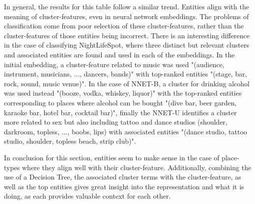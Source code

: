 In general, the results for this table follow a similar trend. Entities align with the meaning of cluster-features, even in neural network embeddings. The problems of classification come from poor selection of these cluster-features, rather than the cluster-features of those entities being incorrect. There is an interesting difference in the case of classifying NightLifeSpot, where three distinct but relevant clusters and associated entities are found and used in each of the embeddings. In the initial embedding, a cluster-feature related to music was used "(audience, instrument, musicians, ..., dancers, bands)" with top-ranked entities  "(stage, bar, rock, sound, music venue)". In the case of NNET-B, a cluster for drinking alcohol was used instead "(booze, vodka, whiskey, liquor)" with the top-ranked entities corresponding to places where  alcohol can be bought "(dive bar, beer garden, karaoke bar, hotel bar, cocktail bar)", finally the NNET-U identifies a cluster more related to sex but also including tattoo and dance studios (shoulder, darkroom, topless, ..., boobs, lips) with associated entities  "(dance studio, tattoo studio, shoulder, topless beach, strip club)". 

In conclusion for this section, entities seem to make sense in the case of place-types where they align well with their cluster-feature. Additionally, combining the use of a Decision Tree, the associated cluster terms with the cluster-feature, as well as the top entities gives great insight into the representation and what it is doing, as each provides valuable context for each other. 

